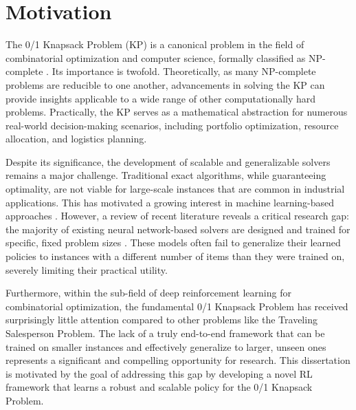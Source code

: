 \section{Motivation}

The 0/1 Knapsack Problem (KP) is a canonical problem in the field of combinatorial optimization and computer science, formally classified as NP-complete \cite{cappartCombinatorialOptimizationReasoning2022}. Its importance is twofold. Theoretically, as many NP-complete problems are reducible to one another, advancements in solving the KP can provide insights applicable to a wide range of other computationally hard problems. Practically, the KP serves as a mathematical abstraction for numerous real-world decision-making scenarios, including portfolio optimization, resource allocation, and logistics planning.

Despite its significance, the development of scalable and generalizable solvers remains a major challenge. Traditional exact algorithms, while guaranteeing optimality, are not viable for large-scale instances that are common in industrial applications. This has motivated a growing interest in machine learning-based approaches \cite{wangSolvingCombinatorialOptimization2024}. However, a review of recent literature reveals a critical research gap: the majority of existing neural network-based solvers are designed and trained for specific, fixed problem sizes \cite{belloNeuralCombinatorialOptimization2017}. These models often fail to generalize their learned policies to instances with a different number of items than they were trained on, severely limiting their practical utility.

Furthermore, within the sub-field of deep reinforcement learning for combinatorial optimization, the fundamental 0/1 Knapsack Problem has received surprisingly little attention compared to other problems like the Traveling Salesperson Problem. The lack of a truly end-to-end framework that can be trained on smaller instances and effectively generalize to larger, unseen ones represents a significant and compelling opportunity for research. This dissertation is motivated by the goal of addressing this gap by developing a novel RL framework that learns a robust and scalable policy for the 0/1 Knapsack Problem.